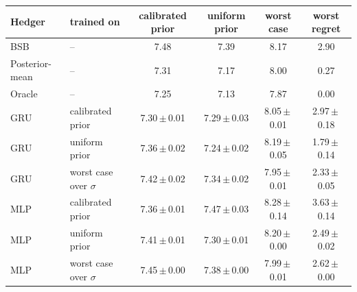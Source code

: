 \begin{tabular}{@{}llcccc@{}}
\toprule
Hedger & trained on & calibrated prior & uniform prior & worst case & worst regret \\
\midrule
BSB & -- & 7.48 & 7.39 & 8.17 & 2.90 \\
Posterior-mean & -- & 7.31 & 7.17 & 8.00 & 0.27 \\
Oracle & -- & 7.25 & 7.13 & 7.87 & 0.00 \\
GRU & calibrated prior & 7.30\,$\pm$\,0.01 & 7.29\,$\pm$\,0.03 & 8.05\,$\pm$\,0.01 & 2.97\,$\pm$\,0.18 \\
GRU & uniform prior & 7.36\,$\pm$\,0.02 & 7.24\,$\pm$\,0.02 & 8.19\,$\pm$\,0.05 & 1.79\,$\pm$\,0.14 \\
GRU & worst case over $\sigma$ & 7.42\,$\pm$\,0.02 & 7.34\,$\pm$\,0.02 & 7.95\,$\pm$\,0.01 & 2.33\,$\pm$\,0.05 \\
MLP & calibrated prior & 7.36\,$\pm$\,0.01 & 7.47\,$\pm$\,0.03 & 8.28\,$\pm$\,0.14 & 3.63\,$\pm$\,0.14 \\
MLP & uniform prior & 7.41\,$\pm$\,0.01 & 7.30\,$\pm$\,0.01 & 8.20\,$\pm$\,0.00 & 2.49\,$\pm$\,0.02 \\
MLP & worst case over $\sigma$ & 7.45\,$\pm$\,0.00 & 7.38\,$\pm$\,0.00 & 7.99\,$\pm$\,0.01 & 2.62\,$\pm$\,0.00 \\
\bottomrule
\end{tabular}
